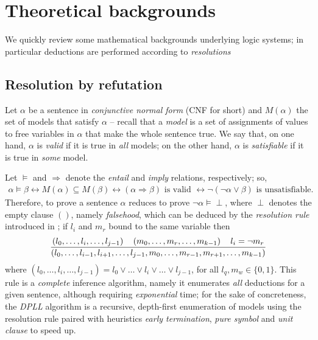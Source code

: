 \documentclass[a4paper,12pt]{article}
\begin{document}
\section{Theoretical backgrounds}

We quickly review some mathematical backgrounds underlying logic systems;
in particular deductions are performed according to \emph{resolutions}

\subsection{Resolution by refutation} 

Let $\alpha$ be a sentence in \emph{conjunctive normal
form} (CNF for short) and $M(\alpha)$ the set of models that satisfy $\alpha$
-- recall that a \emph{model} is a set of assignments of values to free
variables in $\alpha$ that make the whole sentence true.  We say that, on one
hand, $\alpha$ is \textit{valid} if it is true in \textit{all} models; on the
other hand, $\alpha$ is \textit{satisfiable} if it is true in \textit{some}
model.

Let $\models$ and $\Rightarrow$ denote the \textit{entail} and \textit{imply}
relations, respectively; so,
\begin{displaymath}
\begin{split}
\alpha \models \beta \leftrightarrow
M(\alpha) \subseteq M(\beta) \leftrightarrow
(\alpha \Rightarrow \beta) \text{ is valid } \leftrightarrow
\neg(\neg\alpha \vee \beta) \text{ is unsatisfiable.}
\end{split}
\end{displaymath}
Therefore, to prove a sentence $\alpha$ reduces to prove
$\neg\alpha\models\perp$, where $\perp$ denotes the empty clause $()$, namely
\textit{falsehood}, which can be deduced by the \textit{resolution rule}
introduced in \citep{Robinson:1965:MLB:321250.321253}; if $l_{i}$ and $m_{r}$
bound to the same variable then
\begin{displaymath}
{\left(l_{0}, \ldots, l_{i}, \ldots, l_{j-1}\right) \quad \left(m_{0}, \ldots, m_{r},\ldots, m_{k-1}\right) \quad l_{i} = \neg m_{r}
\over
\left(l_{0},\ldots, l_{i-1},l_{i+1}, \ldots,l_{j-1}, m_{0},\ldots, m_{r-1},m_{r+1},\ldots, m_{k-1}\right)}
\end{displaymath}
where $\left(l_{0},\ldots, l_{i}, \ldots, l_{j-1}\right) = l_{0}\vee \ldots
\vee l_{i} \vee \ldots \vee l_{j-1}$, for all $l_{q}, m_{w} \in\lbrace 0,1\rbrace$.
This rule is a \textit{complete} inference algorithm, namely it enumerates
\emph{all} deductions for a given sentence, although requiring
\emph{exponential} time; for the sake of concreteness, the \textit{DPLL}
algorithm \citep{Davis:1962:MPT:368273.368557}
is a recursive, depth-first enumeration of models using the
resolution rule paired with heuristics \textit{early termination},
\textit{pure symbol} and \textit{unit clause} to speed up.
\end{document}
